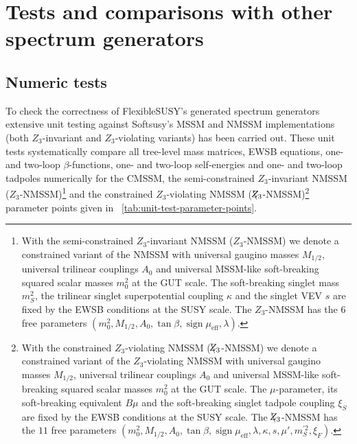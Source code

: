 \documentclass[final,3p,11pt,pdflatex]{elsarticle}
\makeatletter
\newcommand{\fs}{FlexibleSUSY\@\xspace}
\newcommand{\tabref}[1]{\tablename~\ref{#1}}
\newcommand{\Zv}{\mathbf{\backslash}\mkern-11.0mu{Z}}
\DeclareMathOperator{\sign}{sign}
\makeatother
\begin{document}
\section{Tests and comparisons with other spectrum generators}
\label{sec:comparison}

\subsection{Numeric tests}

To check the correctness of \fs's generated spectrum generators
extensive unit testing against Softsusy's MSSM and NMSSM
implementations (both $Z_3$-invariant and $Z_3$-violating variants)
has been carried out.  These unit tests systematically compare all
tree-level mass matrices, EWSB equations, one- and two-loop
$\beta$-functions, one- and two-loop self-energies and one- and
two-loop tadpoles numerically for the CMSSM, the semi-constrained
$Z_3$-invariant NMSSM ($Z_3$-NMSSM)\footnote{With the semi-constrained
  $Z_3$-invariant NMSSM ($Z_3$-NMSSM) we denote a constrained variant
  of the NMSSM with universal gaugino masses $M_{1/2}$, universal
  trilinear couplings $A_0$ and universal MSSM-like soft-breaking
  squared scalar masses $m_0^2$ at the GUT scale.  The soft-breaking
  singlet mass $m_S^2$, the trilinear singlet superpotential coupling
  $\kappa$ and the singlet VEV $s$ are fixed by the EWSB conditions at
  the SUSY scale.  The $Z_3$-NMSSM has the $6$ free parameters
  $(m_0^2, M_{1/2}, A_0, \tan\beta, \sign\mu_\text{eff}, \lambda)$.}
and the constrained $Z_3$-violating NMSSM
($\Zv_3$-NMSSM)\footnote{With the constrained $Z_3$-violating NMSSM
  ($\Zv_3$-NMSSM) we denote a constrained variant of the
  $Z_3$-violating NMSSM with universal gaugino masses $M_{1/2}$,
  universal trilinear couplings $A_0$ and universal MSSM-like
  soft-breaking squared scalar masses $m_0^2$ at the GUT scale.  The
  $\mu$-parameter, its soft-breaking equivalent $B\mu$ and the
  soft-breaking singlet tadpole coupling $\xi_S$ are fixed by the EWSB
  conditions at the SUSY scale.  The $\Zv_3$-NMSSM has the $11$ free
  parameters $(m_0^2, M_{1/2}, A_0, \tan\beta, \sign\mu_\text{eff},
  \lambda, \kappa, s, \mu', m_S^{\prime 2}, \xi_F)$.}  parameter
points given in \tabref{tab:unit-test-parameter-points}.
%
\end{document}
